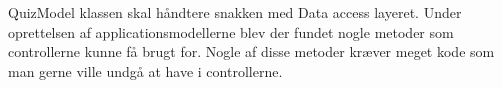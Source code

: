 
QuizModel klassen skal håndtere snakken med Data access layeret. Under oprettelsen af applicationsmodellerne blev der fundet nogle metoder som controllerne kunne få brugt for. Nogle af disse metoder kræver meget kode som man gerne ville undgå at have i controllerne.

